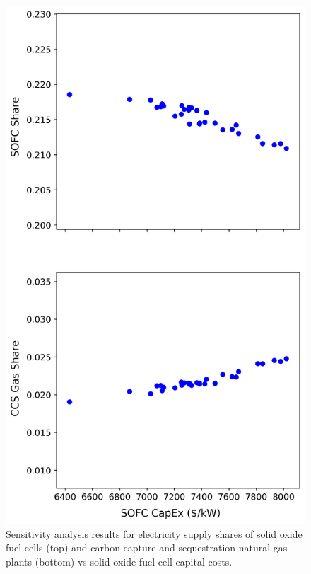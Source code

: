 \begin{figure}[b!] 
\centering
\includegraphics[scale=0.7]{figures/satechselc_abbrv}
\caption{Sensitivity analysis results for electricity supply shares of solid oxide fuel cells (top) and carbon capture and sequestration natural gas plants (bottom) vs solid oxide fuel cell capital costs.}
\label{satechs-smol}
\end{figure}

